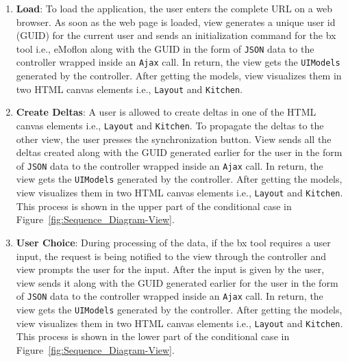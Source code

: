 \begin{enumerate}
	\item {\textbf{Load}: To load the application, the user enters the complete URL on a web browser. As soon as the web page is loaded, view generates a unique user id (GUID) for the current user and sends an initialization command for the bx tool i.e., eMoflon along with the GUID in the form of \texttt{JSON} data to the controller wrapped inside an \texttt{Ajax} call. In return, the view gets the \texttt{UIModels} generated by the controller. After getting the models, view visualizes them in two HTML canvas elements i.e., \texttt{Layout} and \texttt{Kitchen}.}
	
	\item {\textbf{Create Deltas}: A user is allowed to create deltas in one of the HTML canvas elements i.e., \texttt{Layout} and \texttt{Kitchen}. To propagate the deltas to the other view, the user presses the synchronization button. View sends all the deltas created along with the GUID generated earlier for the user in the form of \texttt{JSON} data to the controller wrapped inside an \texttt{Ajax} call. In return, the view gets the \texttt{UIModels} generated by the controller. After getting the models, view visualizes them in two HTML canvas elements i.e., \texttt{Layout} and \texttt{Kitchen}. This process is shown in the upper part of the conditional case in Figure~\ref{fig:Sequence_Diagram-View}.}
	
	\item {\textbf{User Choice}: During processing of the data, if the bx tool requires a user input, the request is being notified to the view through the controller and view prompts the user for the input. After the input is given by the user, view sends it along with the GUID generated earlier for the user in the form of \texttt{JSON} data to the controller wrapped inside an \texttt{Ajax} call. In return, the view gets the \texttt{UIModels} generated by the controller. After getting the models, view visualizes them in two HTML canvas elements i.e., \texttt{Layout} and \texttt{Kitchen}. This process is shown in the lower part of the conditional case in Figure~\ref{fig:Sequence_Diagram-View}.}
\end{enumerate}

